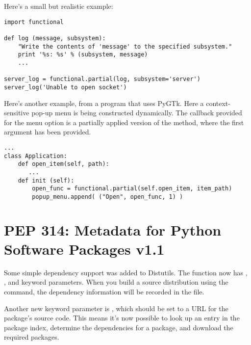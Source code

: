 \documentclass{howto}
\begin{document}
Here's a small but realistic example:

\begin{verbatim}
import functional

def log (message, subsystem):
    "Write the contents of 'message' to the specified subsystem."
    print '%s: %s' % (subsystem, message)
    ...

server_log = functional.partial(log, subsystem='server')
server_log('Unable to open socket')
\end{verbatim}

Here's another example, from a program that uses PyGTk.  Here a
context-sensitive pop-up menu is being constructed dynamically.  The
callback provided for the menu option is a partially applied version
of the  method, where the first argument has been
provided.

\begin{verbatim}
...
class Application:
    def open_item(self, path):
       ...
    def init (self):
        open_func = functional.partial(self.open_item, item_path)
        popup_menu.append( ("Open", open_func, 1) )
\end{verbatim}


\begin{seealso}


\end{seealso}


\section{PEP 314: Metadata for Python Software Packages v1.1}

Some simple dependency support was added to Distutils.  The
 function now has , ,
and  keyword parameters.  When you build a source
distribution using the  command, the dependency
information will be recorded in the  file.

Another new keyword parameter is , which should be
set to a URL for the package's source code.  This means it's now
possible to look up an entry in the package index, determine the
dependencies for a package, and download the required packages.
\end{document}
